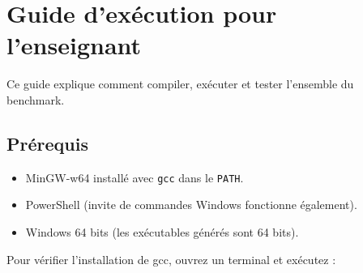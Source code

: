 \documentclass[12pt]{article}
\begin{document}
\section{Guide d'exécution pour l'enseignant}
Ce guide explique comment compiler, exécuter et tester l'ensemble du benchmark.

\subsection{Prérequis}
\begin{itemize}
  \item MinGW-w64 installé avec \texttt{gcc} dans le \texttt{PATH}.
  \item PowerShell (invite de commandes Windows fonctionne également).
  \item Windows 64 bits (les exécutables générés sont 64 bits).
\end{itemize}
Pour vérifier l'installation de gcc, ouvrez un terminal et exécutez :
\end{document}

